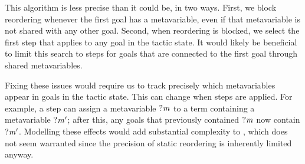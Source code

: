 \begin{algorithm}

  \BlankLine


  \BlankLine

  \BlankLine
  \BlankLine
  \caption{Static reordering}\label{alg:static-reordering}
\end{algorithm}

This algorithm is less precise than it could be, in two ways.
First, we block reordering whenever the first goal has a metavariable, even if that metavariable is not shared with any other goal.
Second, when reordering is blocked, we select the first step that applies to any goal in the tactic state.
It would likely be beneficial to limit this search to steps for goals that are connected to the first goal through shared metavariables.

Fixing these issues would require us to track precisely which metavariables appear in goals in the tactic state.
This can change when steps are applied.
For example, a step can assign a metavariable $\mathit{?m}$ to a term containing a metavariable $\mathit{?m'}$; after this, any goals that previously contained $\mathit{?m}$ now contain $\mathit{?m'}$.
Modelling these effects would add substantial complexity to , which does not seem warranted since the precision of static reordering is inherently limited anyway.

